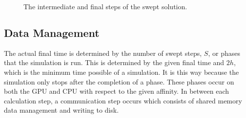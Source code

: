 \documentclass[review]{elsarticle}
\begin{document}
\begin{figure}[!htb]
    \caption{The intermediate and final steps of the swept solution.}
    \label{fig:MainTwo}
\end{figure}

\subsection{Data Management}
The actual final time is determined by the number of swept steps, $S$, or phases that the simulation is run. This is determined by the given final time and $2h$, which is the minimum time possible of a simulation. It is this way because the simulation only stops after the completion of a phase. These phases occur on both the GPU and CPU with respect to the given affinity. In between each calculation step, a communication step occurs which consists of shared memory data management and writing to disk.
\end{document}
